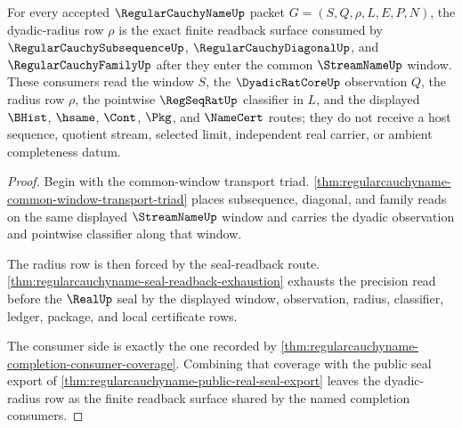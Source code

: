 \begin{theorem}
\label{thm:regularcauchyname-dyadic-radius-readback}
For every accepted $\RegularCauchyNameUp$ packet $G=(S,Q,\rho,L,E,P,N)$, the dyadic-radius row $\rho$ is the exact finite readback surface consumed by $\RegularCauchySubsequenceUp$, $\RegularCauchyDiagonalUp$, and $\RegularCauchyFamilyUp$ after they enter the common $\StreamNameUp$ window. These consumers read the window $S$, the $\DyadicRatCoreUp$ observation $Q$, the radius row $\rho$, the pointwise $\RegSeqRatUp$ classifier in $L$, and the displayed $\BHist$, $\hsame$, $\Cont$, $\Pkg$, and $\NameCert$ routes; they do not receive a host sequence, quotient stream, selected limit, independent real carrier, or ambient completeness datum.
\end{theorem}
\begin{proof}
Begin with the common-window transport triad. \autoref{thm:regularcauchyname-common-window-transport-triad} places subsequence, diagonal, and family reads on the same displayed $\StreamNameUp$ window and carries the dyadic observation and pointwise classifier along that window.

The radius row is then forced by the seal-readback route. \autoref{thm:regularcauchyname-seal-readback-exhaustion} exhausts the precision read before the $\RealUp$ seal by the displayed window, observation, radius, classifier, ledger, package, and local certificate rows.

The consumer side is exactly the one recorded by \autoref{thm:regularcauchyname-completion-consumer-coverage}. Combining that coverage with the public seal export of \autoref{thm:regularcauchyname-public-real-seal-export} leaves the dyadic-radius row as the finite readback surface shared by the named completion consumers.
\end{proof}

